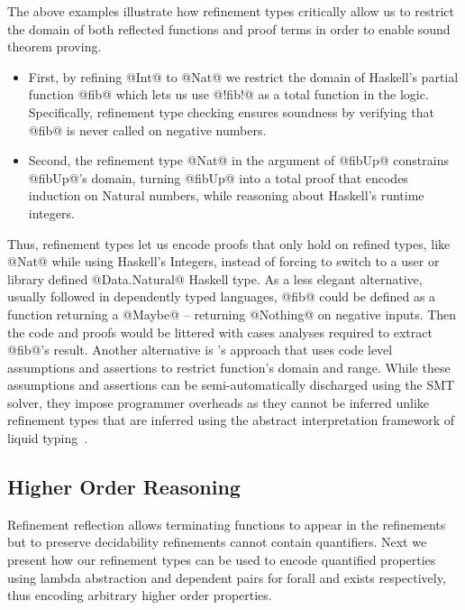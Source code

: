 The above examples illustrate how refinement types
critically allow us to restrict the domain of both
reflected functions and proof terms in order to
enable sound theorem proving.
%
\begin{itemize}
  \item {}
  First, by refining @Int@ to @Nat@ we restrict
  the domain of Haskell's partial function @fib@
  which lets us use @!fib!@ as a total function in
  the logic. Specifically, refinement type checking
  ensures soundness by verifying that @fib@ is never
  called on negative numbers.
%
\item {}
  Second, the refinement type @Nat@
  in the argument of @fibUp@ constrains @fibUp@'s
  domain, turning @fibUp@ into a total proof that
  encodes induction on Natural numbers, while
  reasoning about Haskell's runtime integers.
\end{itemize}
%
Thus, refinement types let us encode proofs that
only hold on refined types, like @Nat@ while using
Haskell's Integers, instead of forcing to switch
to a user or library defined @Data.Natural@ Haskell
type.
%
As a less elegant alternative, usually followed
in dependently typed languages, @fib@ could be
defined as a function returning a @Maybe@ -- \ie
returning @Nothing@ on negative inputs.
%
%
Then the code and proofs would be littered with cases analyses
required to extract @fib@'s result.
%
Another alternative is \dafny's approach
that uses code level assumptions and assertions
to restrict function's domain and range.
%
While these assumptions and assertions can
be semi-automatically discharged using the
SMT solver, they impose programmer overheads
as they cannot be inferred unlike refinement
types that are inferred using
the abstract interpretation framework of
liquid typing~\cite{LiquidPLDI08}.


\subsection{Higher Order Reasoning}

Refinement reflection allows terminating functions to appear in the refinements
but to preserve decidability refinements cannot contain quantifiers.
%
Next we present how our refinement types can be used to
encode quantified properties using lambda abstraction and dependent pairs
for forall and exists respectively,
thus encoding arbitrary higher order properties.

